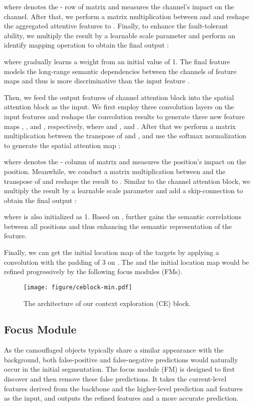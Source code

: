 \documentclass[final]{cvpr}
\begin{document}
where  denotes the - row of matrix  and  measures the  channel's impact on the  channel. After that, we perform a matrix multiplication between  and  and reshape the aggregated attentive features to . Finally, to enhance the fault-tolerant ability, we multiply the result by a learnable scale parameter  and perform an identify mapping operation to obtain the final output :

where  gradually learns a weight from an initial value of 1. The final feature  models the long-range semantic dependencies between the channels of feature maps and thus is more discriminative than the input feature .

Then, we feed the output features of channel attention block into the spatial attention block as the input. We first employ three  convolution layers on the input features  and reshape the convolution results to generate three new feature maps , , and , respectively, where  and , and . After that we perform a matrix multiplication between the transpose of  and , and use the softmax normalization to generate the spatial attention map :

where  denotes the - column of matrix  and  measures the  position's impact on the  position. Meanwhile, we conduct a matrix multiplication between  and the transpose of  and reshape the result to . Similar to the channel attention block, we multiply the result by a learnable scale parameter  and add a skip-connection to obtain the final output :

where  is also initialized as 1. Based on ,  further gains the semantic correlations between all positions and thus enhancing the semantic representation of the feature.

Finally, we can get the initial location map of the targets by applying a  convolution with the padding of 3 on . The  and the initial location map would be refined progressively by the following focus modules (FMs).

\begin{figure}[tbp]
	\begin{center}
		\texttt{[image: figure/ceblock-min.pdf]}
	\end{center}
\caption{\small The architecture of our context exploration (CE) block.}
	\label{fig:ceblock}
\end{figure}

\subsection{Focus Module}
As the camouflaged objects typically share a similar appearance with the background, both false-positive and false-negative predictions would naturally occur in the initial segmentation. The focus module (FM) is designed to first discover and then remove these false predictions. It takes the current-level features derived from the backbone and the higher-level prediction and features as the input, and outputs the refined features and a more accurate prediction.
\end{document}
